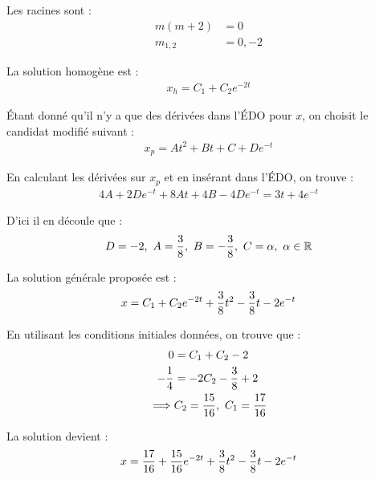 Les racines sont :
\begin{align*}
    m(m+2) &= 0 \\
    m_{1,2} &= 0,-2
\end{align*}

La solution homogène est :
\begin{align*}
    x_h = C_1 + C_2 e^{-2t}
\end{align*}

Étant donné qu'il n'y a que des dérivées dans l'ÉDO pour $x$, on choisit le
candidat modifié suivant :
\begin{align*}
    x_p = At^2 + Bt + C + De^{-t}
\end{align*}

En calculant les dérivées sur $x_p$ et en insérant dans l'ÉDO, on trouve :
\begin{align*}
    4A + 2De^{-t} + 8At + 4B - 4De^{-t} = 3t + 4e^{-t}
\end{align*}

D'ici il en découle que :
\begin{align*}
    D=-2,\ A=\dfrac{3}{8},\ B=-\dfrac{3}{8},\ C = \alpha,\ \alpha\in \mathbb{R}
\end{align*}

La solution générale proposée est :
\begin{align*}
    x = C_1 + C_2 e^{-2t} +\dfrac{3}{8}t^2 - \dfrac{3}{8}t - 2e^{-t}
\end{align*}

En utilisant les conditions initiales données, on trouve que :
\begin{align*}
    0 &= C_1 + C_2 - 2 \\
    -\dfrac{1}{4} &= -2C_2 -\dfrac{3}{8} + 2 \\
    \implies& C_2 = \dfrac{15}{16},\ C_1 = \dfrac{17}{16}
\end{align*}

La solution devient :
\begin{align*}
    x = \dfrac{17}{16} +\dfrac{15}{16}e^{-2t} +\dfrac{3}{8}t^2 -\dfrac{3}{8}t -2e^{-t}
\end{align*}
